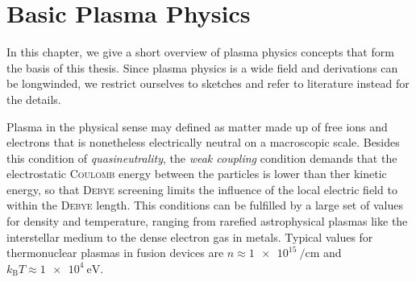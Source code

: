 \section{Basic Plasma Physics}
\label{sec:plasma}

In this chapter, we give a short overview of plasma physics concepts that form the basis of this thesis. Since plasma physics is a wide field and derivations can be longwinded, we restrict ourselves to sketches and refer to literature instead for the details.

Plasma in the physical sense may defined as matter made up of free ions and electrons that is nonetheless electrically neutral on a macroscopic scale. Besides this condition of \emph{quasineutrality}, the \emph{weak coupling} condition demands that the electrostatic \textsc{Coulomb} energy between the particles is lower than ther kinetic energy, so that \textsc{Debye} screening limits the influence of the local electric field to within the \textsc{Debye} length. This conditions can be fulfilled by a large set of values for density and temperature, ranging from rarefied astrophysical plasmas like the interstellar medium to the dense electron gas in metals. Typical values for thermonuclear plasmas in fusion devices are $n \approx \SI{1e15}{\per\centi\meter}$ and $k_{\text{B}} T \approx \SI{1e4}{\electronvolt}$.

